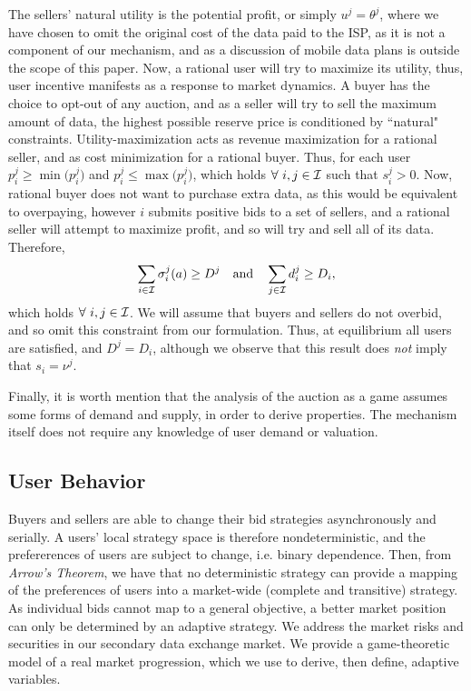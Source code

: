 The sellers' natural utility is the potential
profit, or simply $u^j = \theta^j$, where we have chosen to omit the original cost of the data
paid to the ISP, as it is not a component of our mechanism, and as a discussion
of mobile data plans is outside the scope of this paper.  
Now, a rational user will try
to maximize its utility, thus, user incentive manifests as a
response to market dynamics. A buyer has the choice to
opt-out of any auction, and as a seller will try to sell the maximum amount of
data, the highest possible reserve price is conditioned by ``natural" constraints. Utility-maximization 
acts as revenue maximization for a rational seller, and as cost minimization for a
rational buyer. Thus, for each user $p_i^j \ge \min\big(p_i^j)$ and $p_i^j \le
\max\big(p_i^j)$, which holds $\forall \ i, j\in\mathcal{I}$ such that $s_i^j>0$.
Now, rational buyer does not want to purchase extra data, as this would be
equivalent to overpaying, however $i$ submits positive bids to a set of
sellers, and a rational seller will attempt to maximize profit, and so will try and sell all of
its data. Therefore,
\begin{equation}\label{bidcap}
    \displaystyle\sum_{i\in\mathcal{I}} \sigma_i^j(a) \ge D^j \quad\text{and}\quad
\sum_{j\in\mathcal{I}} d^j_i \ge D_i,
\end{equation}
which holds $\forall \ i,j\in\mathcal{I}$. We will assume that buyers and sellers do not overbid, and so omit this
constraint from our formulation.
Thus, at equilibrium all users are satisfied, and 
$D^j = D_i$, although we observe that this result
does \emph{not} imply that $s_i=\nu^j$. 

Finally, it is worth mention that the analysis of the auction as
a game assumes some forms of demand and supply, in order to derive properties.
The mechanism itself does not require any knowledge of user demand or
valuation. 

\subsection{User Behavior}

Buyers and sellers are able
to change their bid strategies asynchronously and serially.
A users' local strategy space is therefore nondeterministic, and the prefererences of users
are subject to change, i.e. binary dependence.
Then, from \emph{Arrow's Theorem}, we have that no deterministic strategy can
provide a mapping of the preferences of users into a market-wide (complete
and transitive) strategy. As individual bids cannot map to a general objective, a better market
position can only be determined by an adaptive strategy.
We address the market risks and securities in our secondary data exchange market. 
We provide a game-theoretic model of a real market progression, which we use to
derive, then define, adaptive variables. 

